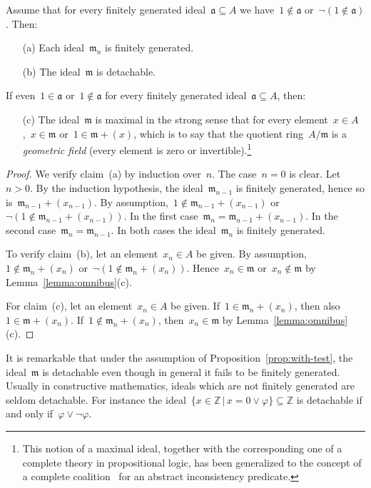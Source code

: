 \documentclass[envcountsect,envcountsame,runningheads]{llncs}
\newcommand{\aaa}{\mathfrak{a}}
\newcommand{\mmm}{\mathfrak{m}}
\newcommand{\ZZ}{\mathbb{Z}}
\renewcommand{\_}{\mathpunct{.}\,}
\begin{document}
\begin{proposition}\label{prop:with-test}
Assume that for every finitely generated ideal~$\aaa \subseteq A$ we have~$1
\not\in \aaa$ or~$\neg(1 \not\in \aaa)$. Then:
\begin{enumerate}
\item[\textnormal{(a)}] Each ideal~$\mmm_n$ is finitely generated.
\item[\textnormal{(b)}] The ideal~$\mmm$ is detachable.
\end{enumerate}
If even~$1 \in \aaa$ or~$1 \not\in \aaa$ for every finitely generated ideal~$\aaa \subseteq
A$, then:
\begin{enumerate}
\addtocounter{enumi}{2}
\item[\textnormal{(c)}] The ideal~$\mmm$ is maximal in the strong sense that for every element~$x
\in A$,~$x \in \mmm$ or~$1 \in \mmm + (x)$, which is to say that the quotient ring~$A/\mmm$ is a
\emph{geometric field} (every element is zero or invertible).\footnote{This
notion of a maximal ideal, together with the corresponding one of a complete
theory in propositional logic, has been generalized to the concept of a
complete coalition~\cite{schuster-wessel:cie2020,schuster-wessel:jacincpred} for an abstract inconsistency
predicate.}
\end{enumerate}
\end{proposition}

\begin{proof}We verify claim~(a) by induction over~$n$. The case~$n = 0$ is
clear. Let~$n > 0$. By the induction hypothesis, the ideal~$\mmm_{n-1}$ is finitely
generated, hence so is~$\mmm_{n-1} + (x_{n-1})$. By assumption,~$1 \not\in \mmm_{n-1} +
(x_{n-1})$ or~$\neg(1 \not\in \mmm_{n-1} + (x_{n-1}))$. In the first
case~$\mmm_n = \mmm_{n-1} + (x_{n-1})$. In the second case~$\mmm_n =
\mmm_{n-1}$. In both cases
the ideal~$\mmm_n$ is finitely generated.

To verify claim~(b), let an element~$x_n \in A$ be given. By assumption,~$1
\not\in \mmm_n + (x_n)$ or~$\neg(1 \not\in \mmm_n + (x_n))$. Hence~$x_n \in
\mmm$ or~$x_n \not\in \mmm$ by Lemma~\ref{lemma:omnibus}(c).

For claim~(c), let an element~$x_n \in A$ be given. If~$1 \in \mmm_n + (x_n)$,
then also~$1 \in \mmm + (x_n)$. If~$1 \not\in \mmm_n + (x_n)$, then~$x_n \in
\mmm$ by Lemma~\ref{lemma:omnibus}(c).
\end{proof}

It is remarkable that under the assumption of Proposition~\ref{prop:with-test}, the ideal~$\mmm$ is detachable even though in
general it fails to be finitely generated. Usually in constructive mathematics, ideals which are not
finitely generated are seldom detachable. For instance the ideal~$\{ x \in
\ZZ \,|\, x = 0 \vee \varphi \} \subseteq \ZZ$ is detachable if and only
if~$\varphi \vee \neg\varphi$.
\end{document}
